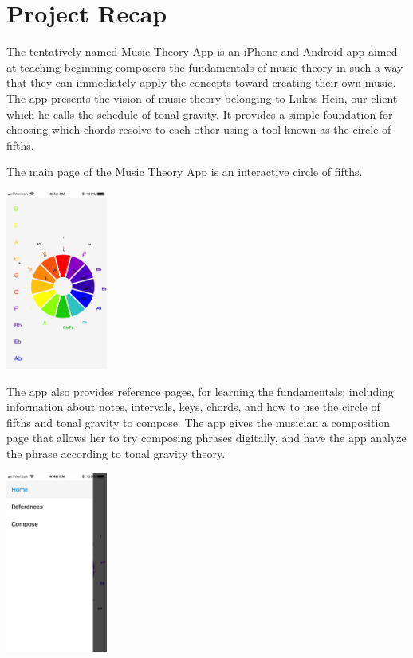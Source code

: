 \documentclass[onecolumn, draftclsnofoot,10pt, compsoc]{IEEEtran}
\begin{document}
\section{Project Recap}

The tentatively named Music Theory App is an iPhone and Android app aimed at teaching beginning composers the fundamentals of music theory in such a way that they can immediately apply the concepts toward creating their own music. 
The app presents the vision of music theory belonging to Lukas Hein, our client which he calls the schedule of tonal gravity. 
It provides a simple foundation for choosing which chords resolve to each other using a tool known as the circle of fifths.

The main page of the Music Theory App is an interactive circle of fifths.

\includegraphics[width=0.25\textwidth]{cof}

The app also provides reference pages, for learning the fundamentals: including information about notes, intervals, keys, chords, and how to use the circle of fifths and tonal gravity to compose.
The app gives the musician a composition page that allows her to try composing phrases digitally, and have the app analyze the phrase according to tonal gravity theory.

\includegraphics[width=0.25\textwidth]{menu}
\end{document}
